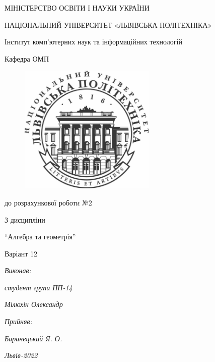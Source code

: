 \begin{titlepage}
\begin{center}

	{\fontsize{14}{24}\selectfont МІНІСТЕРСТВО ОСВІТИ І НАУКИ УКРАЇНИ

	НАЦІОНАЛЬНИЙ УНІВЕРСИТЕТ «ЛЬВІВСЬКА ПОЛІТЕХНІКА»

	Інститут комп'ютерних наук та інформаційних технологій

	Кафедра ОМП

	}

	\vspace{70.4pt} %
	\begin{figure}[h]
		\centering
		\includegraphics[width=6.5cm,keepaspectratio]{../../lpnu.png}
	\end{figure}

	{\fontsize{18}{29}\selectfont{Звіт}

	{до розрахункової роботи №2}

	{З дисципліни}

	{``Алгебра та геометрія''}

	{Варіант 12}

	}
\end{center}

\vspace{12.1pt} %
	{\fontsize{14}{22.4}\selectfont
\begin{flushright}
	\textit{Виконав:}

	\textit{студент групи ПП-14}

	\textit{Мілюхін Олександр}

	\textit{Прийняв:}

	\textit{Баранецький Я. О.}
\end{flushright}
\vspace{37.4pt} %
\begin{center}
\textit{Львів-2022}
\vspace{37.4pt} %
\end{center}
	}

\end{titlepage}
